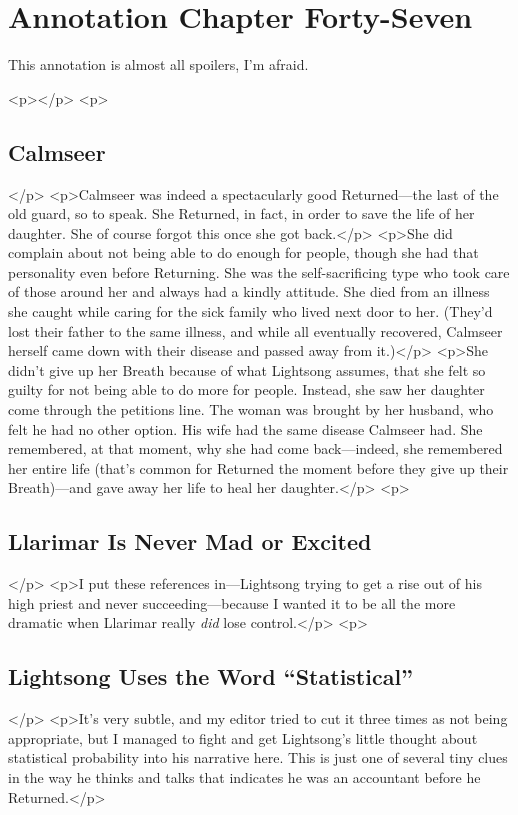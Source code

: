 \section{Annotation Chapter Forty-Seven}

This annotation is almost all spoilers, I’m afraid.



<p></p>
<p>\subsection*{Calmseer}</p>
<p>Calmseer was indeed a spectacularly good Returned—the last of the old guard, so to speak. She Returned, in fact, in order to save the life of her daughter. She of course forgot this once she got back.</p>
<p>She did complain about not being able to do enough for people, though she had that personality even before Returning. She was the self-sacrificing type who took care of those around her and always had a kindly attitude. She died from an illness she caught while caring for the sick family who lived next door to her. (They’d lost their father to the same illness, and while all eventually recovered, Calmseer herself came down with their disease and passed away from it.)</p>
<p>She didn’t give up her Breath because of what Lightsong assumes, that she felt so guilty for not being able to do more for people. Instead, she saw her daughter come through the petitions line. The woman was brought by her husband, who felt he had no other option. His wife had the same disease Calmseer had. She remembered, at that moment, why she had come back—indeed, she remembered her entire life (that’s common for Returned the moment before they give up their Breath)—and gave away her life to heal her daughter.</p>
<p>\subsection*{Llarimar Is Never Mad or Excited}</p>
<p>I put these references in—Lightsong trying to get a rise out of his high priest and never succeeding—because I wanted it to be all the more dramatic when Llarimar really \textit{did} lose control.</p>
<p>\subsection*{Lightsong Uses the Word “Statistical”}</p>
<p>It’s very subtle, and my editor tried to cut it three times as not being appropriate, but I managed to fight and get Lightsong’s little thought about statistical probability into his narrative here. This is just one of several tiny clues in the way he thinks and talks that indicates he was an accountant before he Returned.</p>
